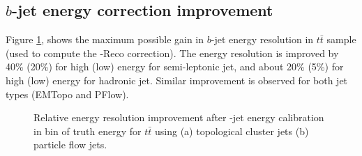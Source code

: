 \subsection{$b$-jet energy correction improvement}
\label{Jet:Cal:BCal:Result}
Figure \ref{fig:Jet:Cal:BCal:Result:E}, shows the maximum possible gain in $b$-jet energy resolution in $t\bar{t}$ sample (used to compute the \pT-Reco correction). The energy resolution is improved by 40\% (20\%) for high (low) energy for semi-leptonic jet, and about 20\% (5\%) for high (low) energy for hadronic jet. Similar improvement is observed for both jet types (EMTopo and PFlow).
\begin{figure}[htbp]
   \centering
   \quad
   \begin{tcolorbox}[colback=black!5!white,colframe=white!75!black]
   \caption{Relative energy resolution improvement after \bq-jet energy calibration in bin of truth energy for $t\bar{t}$ using (a) topological cluster jets (b) particle flow jets.}
    \label{fig:Jet:Cal:BCal:Result:E}
   \end{tcolorbox}

\end{figure}

